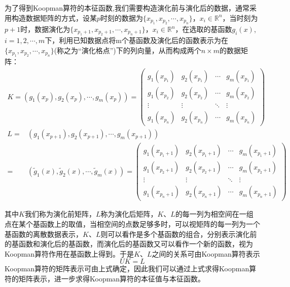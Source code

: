 为了得到Koopman算符的本征函数,我们需要构造演化前与演化后的数据，通常采用构造数据矩阵的方式，设某$p$时刻的数据为$\{x_{p_1},x_{p_2},\cdots,x_{p_n}\}$，$x_i\in \mathbb{R}^n$，当时刻为$p+1$时，数据演化为$\{x_{p_1+1},x_{p_2+1},\cdots,x_{p_n+1}\}$，$x_i\in \mathbb{R}^n$，在选取的基函数${g_i(x)}$,$i=1,2,\cdots,m$下，利用已知数据点将m个基函数及演化后的函数表示为在$\{x_{p_1},x_{p_2},\cdots,x_{p_n}\}$(称之为“演化格点”)下的列向量，从而构成两个$n\times m$的数据矩阵：
\begin{equation}
    \begin{aligned}
        K=(g_1(x_p),g_2(x_p),\cdots,g_m(x_p))=
        \begin{pmatrix}
        g_1(x_{p_1}) & g_2(x_{p_1}) & \cdots & g_m(x_{p_1}) \\
        g_1(x_{p_2}) & g_2(x_{p_2}) & \cdots & g_m(x_{p_2}) \\
        \vdots       & \vdots       & \ddots & \vdots \\
        g_1(x_{p_n}) & g_2(x_{p_n}) & \cdots & g_m(x_{p_n})
        \end{pmatrix}
    \end{aligned}
\end{equation}
\begin{equation}
    \begin{aligned}
    L=&(g_1(x_{p+1}),g_2(x_{p+1}),\cdots,g_m(x_{p+1}))\\
    =&(\tilde{g}_1(x),\tilde{g}_2(x),\cdots,\tilde{g}_m(x))=
        \begin{pmatrix}
        g_1(x_{p_1+1}) & g_2(x_{p_1+1}) & \cdots & g_m(x_{p_1+1}) \\
        g_1(x_{p_2+1}) & g_2(x_{p_2+1}) & \cdots & g_m(x_{p_2+1}) \\
        \vdots         & \vdots         & \ddots & \vdots \\
        g_1(x_{p_n+1}) & g_2(x_{p_n+1}) & \cdots & g_m(x_{p_n+1})
        \end{pmatrix}
    \end{aligned}
\end{equation}

其中$K$我们称为演化前矩阵，$L$称为演化后矩阵，$K$、$L$的每一列为相空间在一组点在某个基函数上的取值，当相空间的点数足够多时，可以视矩阵的每一列为一个基函数的离散数据表示，$K$、$L$则可以看作是多个基函数的组合，分别表示演化前的基函数和演化后的基函数，而演化后的基函数又可以看作一个新的函数，视为Koopman算符作用在基函数上得到。于是$K$、$L$之间的关系可由Koopman算符表示
\begin{equation}
    UK=L
\end{equation}
Koopman算符的矩阵表示可由上式确定，因此我们可以通过上式求得Koopman算符的矩阵表示，进一步求得Koopman算符的本征值与本征函数。

